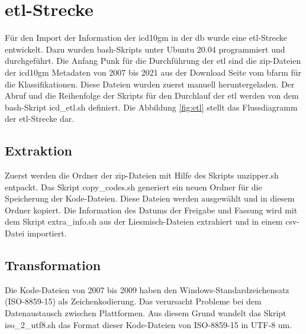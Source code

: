\section{\acs{etl}-Strecke} \label{etlpipeline}

Für den Import der Information der \ac{icd10gm} in der \ac{db} wurde eine \ac{etl}-Strecke entwickelt. Dazu wurden \ac{bash}-Skripts unter Ubuntu 20.04 programmiert und durchgeführt. Die Anfang Punk für die Durchführung der \ac{etl} sind die \ac{zip}-Dateien der \ac{icd10gm} Metadaten von 2007 bis 2021 aus der Download Seite vom \ac{bfarm} für die Klassifikationen. Diese Dateien wurden zuerst manuell heruntergeladen. Der Abruf und die Reihenfolge der Skripts für den Durchlauf der \ac{etl} werden von dem \ac{bash}-Skript \textsf{icd\_etl.sh} definiert. Die Abbildung \ref{fig:etl} stellt das Flussdiagramm der \ac{etl}-Strecke dar.

\subsection{Extraktion}

Zuerst werden die Ordner der \ac{zip}-Dateien mit Hilfe des Skripts \textsf{unzipper.sh} entpackt. Das Skript \textsf{copy\_codes.sh} generiert ein neuen Ordner für die Speicherung der Kode-Dateien. Diese Dateien werden ausgewählt und in diesem Ordner kopiert. Die Information des Datums der Freigabe und Fassung wird mit dem Skript \textsf{extra\_info.sh} aus der Liesmisch-Dateien extrahiert und in einem \ac{csv}-Datei importiert.

\subsection{Transformation}

Die Kode-Dateien von 2007 bis 2009 haben den Windows-Standardzeichensatz (ISO-8859-15) als Zeichenkodierung. Das verursacht Probleme bei dem Datenaustausch zwischen Plattformen. Aus diesem Grund wandelt das Skript \textsf{iso\_2\_utf8.sh} das Format dieser Kode-Dateien von ISO-8859-15 in UTF-8 um.


